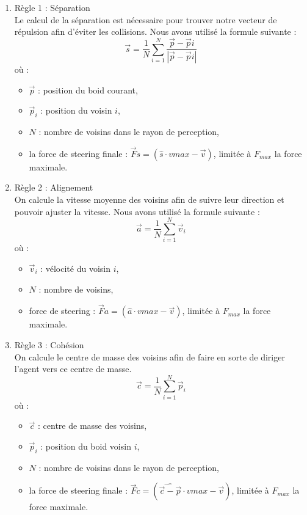 \documentclass[conference]{IEEEtran}
\begin{document}
\begin{enumerate}
	\item Règle 1 : Séparation\\
	      Le calcul de la séparation est nécessaire pour trouver notre vecteur de répulsion afin d’éviter les collisions. Nous avons utilisé la formule suivante :
	      \begin{equation}
		      \vec{s} = \frac{1}{N}\sum_{i = 1}^{N} \frac{\vec{p} - \vec{p}{i}}{|\vec{p} - \vec{p}{i}|}
	      \end{equation}
	      où :
	      \begin{itemize}
		      \item $\vec{p}$ : position du boid courant,
		      \item $\vec{p}_{i}$ : position du voisin $i$,
		      \item $N$ : nombre de voisins dans le rayon de perception,
		      \item la force de steering finale : $\vec{F}{s} = (\hat{s} \cdot v{max} - \vec{v})$, limitée à $F_{max}$ la force maximale.
	      \end{itemize}

	\item Règle 2 : Alignement\\
	      On calcule la vitesse moyenne des voisins afin de suivre leur direction et pouvoir ajuster la vitesse. Nous avons utilisé la formule suivante :
	      \begin{equation}
		      \vec{a} = \frac{1}{N}\sum_{i = 1}^{N}\vec{v}_{i}
	      \end{equation}
	      où :
	      \begin{itemize}
		      \item $\vec{v}_{i}$ : vélocité du voisin $i$,
		      \item $N$ : nombre de voisins,
		      \item force de steering : $\vec{F}{a} = (\hat{a} \cdot v{max} - \vec{v})$, limitée à $F_{max}$ la force maximale.
	      \end{itemize}

	\item Règle 3 : Cohésion\\
	      On calcule le centre de masse des voisins afin de faire en sorte de diriger l’agent vers ce centre de masse.
	      \begin{equation}
		      \vec{c} = \frac{1}{N}\sum_{i = 1}^{N}\vec{p}_{i}
	      \end{equation}
	      où :
	      \begin{itemize}
		      \item $\vec{c}$ : centre de masse des voisins,
		      \item $\vec{p}_{i}$ : position du boid voisin $i$,
		      \item $N$ : nombre de voisins dans le rayon de perception,
		      \item la force de steering finale : $\vec{F}{c} = (\widehat{\vec{c} - \vec{p}} \cdot v{max} - \vec{v})$, limitée à $F_{max}$ la force maximale.
	      \end{itemize}
\end{enumerate}
\end{document}
